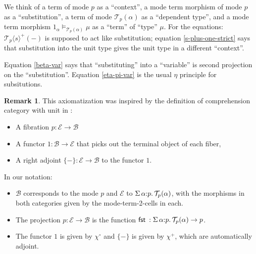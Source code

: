 \documentclass[10pt]{article}
\theoremstyle{definition}
\newtheorem{remark}{Remark}
\newcommand\dsd[1]{\ensuremath{\mathsf{#1}}}
\newcommand{\Yields}{\vDash}
\newcommand\TrPlus[2]{\ensuremath{{#1}^+(#2)}}
\newcommand\El[2]{\mathcal{T}_{#1}(#2)}
\newcommand\ApEl[2]{\mathcal{T}_{#1}\langle#2\rangle}
\newcommand{\app}[2]{\ensuremath{#1 \: #2}}
\newcommand{\sigmacl}[3]{\ensuremath{\textnormal{$\Sigma$}\,#1{:}#2.\,#3}}
\newcommand{\fst}[1]{\app{\dsd{fst}}{#1}}
\begin{document}
We think of a term of mode $p$ as a ``context'', a mode term morphism of
mode $p$ as a ``substitution'', a term of mode $\El{p}{\alpha}$ as a
``dependent type'', and a mode term morphism $1_\alpha
\Yields_{\El{p}{\alpha}} \mu$ as a ``term'' of ``type'' $\mu$.  For the
equations: $\TrPlus{\ApEl{p}{s}}{-}$ is supposed to act like
substitution; equation \eqref{s-plus-one-strict} says that substitution
into the unit type gives the unit type in a different ``context''.

Equation \eqref{beta-var} says that ``substituting'' into a ``variable'' is second projection on the ``substitution''.  Equation \eqref{eta-pi-var} is the usual $\eta$ principle for subsitutions.

\begin{remark}
This axiomatization was inspired by the definition of comprehension
category with unit in \cite{ahman+16fibered}:
\begin{itemize}
\item A fibration $p : \mathcal{E} \to \mathcal{B}$
\item A functor $1 : \mathcal{B} \to \mathcal{E}$ that picks out the terminal object of each fiber,
\item A right adjoint $\{-\} : \mathcal{E} \to \mathcal{B}$ to the functor $1$.
\end{itemize}
In our notation:
\begin{itemize}
\item $\mathcal{B}$ corresponds to the mode $p$ and $\mathcal{E}$ to $\sigmacl{\alpha}{p}{\El{p}{\alpha}}$, with the morphisms in both categories given by the mode-term-2-cells in each.

\item The projection $p : \mathcal{E} \to \mathcal{B}$ is the function $\fst : \sigmacl{\alpha}{p}{\El{p}{\alpha}} \to p$. 

\item The functor $1$ is given by $\chi^\circ$ and $\{-\}$ is given by $\chi^+$, which are automatically adjoint.
\end{itemize}
\end{remark}
\end{document}
